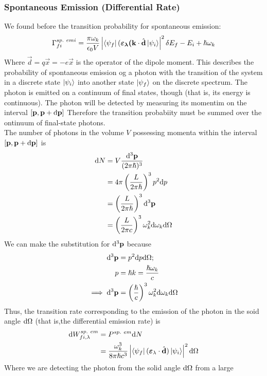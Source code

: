\documentclass[a4paper]{article}
\begin{document}
\subsubsection{Spontaneous Emission (Differential Rate)}
We found before the transition probability for spontaneous emission:
\[
	\Gamma^{sp.\ emi}_{fi} = \frac{\pi\omega_k}{\epsilon_0V}
	\left\lvert 
		\left\langle \psi_f \right\rvert(\boldsymbol{\mathbf{\varepsilon_{\lambda}(\boldsymbol{\mathbf{k}}}}
		\cdot \hat{\boldsymbol{\mathbf{d}}}\left\lvert \psi_i\right\rangle
	\right\rvert^2 \delta{E_f-E_i+\hslash\omega_k}
\]
Where $\vec{d} = q\vec{x} = -e\vec{x}$ is the operator of the dipole moment.
This describes the probability of spontaneous emission og a photon with the
transition of the system in a discrete state $\left\lvert \psi_i\right\rangle$ into another state
$\left\lvert \psi_f\right\rangle$ on the discrete spectrum. The photon is emitted on a continuum
of final states, though (that is, its energy is continuous). The photon will be
detected by measuring its momentim on the interval
$[\boldsymbol{\mathbf{p}},\boldsymbol{\mathbf{p}} + \mathrm{d}\boldsymbol{\mathbf{p}}]$ Therefore the transition probabiity must be
summed over the ontinuum of final-state photons.\\
The number of photons in the volume $V$ possessing momenta within the interval
$[\boldsymbol{\mathbf{p}},\boldsymbol{\mathbf{p}} + \mathrm{d}\boldsymbol{\mathbf{p}}]$ is
\begin{align*}
	\mathrm{d} N &= V\frac{\mathrm{d}^3\boldsymbol{\mathbf{p}}}{(2\pi\hslash)^3}\\
	     &= 4\pi\left(\frac{L}{2\pi\hslash}\right)^3p^2\mathrm{d} p\\
	     &= \left(\frac{L}{2\pi\hslash}\right)^3\mathrm{d}^3\boldsymbol{\mathbf{p}}\\
	     &= \left(\frac{L}{2\pi c}\right)^3 
		\omega_k^2\mathrm{d}\omega_k\mathrm{d}\Omega
\end{align*}
We can make the substitution for $\mathrm{d}^3\boldsymbol{\mathbf{p}}$ because
\begin{align*}
	\mathrm{d}^3\boldsymbol{\mathbf{p}} &= p^2\mathrm{d} p\mathrm{d}\Omega;\\
	p &= \hslash k = \frac{\hslash\omega_k}{c}\\
	\implies \mathrm{d}^3\boldsymbol{\mathbf{p}} &= \left(\frac{\hslash}{c}\right)^3
		\omega_k^2\mathrm{d}\omega_k\mathrm{d}\Omega
\end{align*}
Thus, the transition rate corresponding to the emission of the photon in the
soid angle $\mathrm{d}\Omega$ (that is,the differential emission rate) is
\begin{align*}
	\mathrm{d} W^{sp.\ em}_{fi,\lambda} 
		&= P^{sp.\ em}\mathrm{d} N\\
		&= \frac{\omega_k^3}{8\pi\hslash c^3}
		\left\lvert 
			\left\langle \psi_f \right\rvert(\boldsymbol{\mathbf{\varepsilon}}_\lambda \cdot
			\hat{\boldsymbol{\mathbf{d}}}) \left\lvert \psi_i\right\rangle
		\right\rvert^2 \mathrm{d}\Omega
\end{align*}
Where we are detecting the photon from the solid angle $\mathrm{d}\Omega$ from a large
\end{document}
